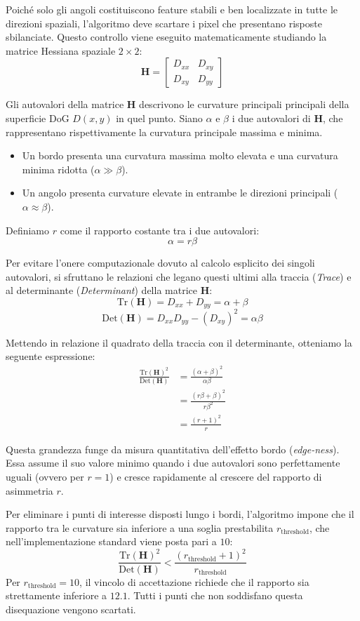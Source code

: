 ﻿\documentclass[11pt, a4paper]{article}
\begin{document}
Poiché solo gli angoli costituiscono feature stabili e ben localizzate in tutte le direzioni spaziali, l'algoritmo deve scartare i pixel che presentano risposte sbilanciate. Questo controllo viene eseguito matematicamente studiando la matrice Hessiana spaziale $2 \times 2$:
\[ \bm{H} = \begin{bmatrix} D_{xx} & D_{xy} \\ D_{xy} & D_{yy} \end{bmatrix} \]

Gli autovalori della matrice $\bm{H}$ descrivono le curvature principali principali della superficie DoG $D(x, y)$ in quel punto. Siano $\alpha$ e $\beta$ i due autovalori di $\bm{H}$, che rappresentano rispettivamente la curvatura principale massima e minima.
\begin{itemize}
    \item Un bordo presenta una curvatura massima molto elevata e una curvatura minima ridotta ($\alpha \gg \beta$).
    \item Un angolo presenta curvature elevate in entrambe le direzioni principali ($\alpha \approx \beta$).
\end{itemize}

Definiamo $r$ come il rapporto costante tra i due autovalori:
\[ \alpha = r\beta \]

Per evitare l'onere computazionale dovuto al calcolo esplicito dei singoli autovalori, si sfruttano le relazioni che legano questi ultimi alla traccia (\emph{Trace}) e al determinante (\emph{Determinant}) della matrice $\bm{H}$:
\[ \text{Tr}(\bm{H}) = D_{xx} + D_{yy} = \alpha + \beta \]
\[ \text{Det}(\bm{H}) = D_{xx}D_{yy} - (D_{xy})^2 = \alpha\beta \]

Mettendo in relazione il quadrato della traccia con il determinante, otteniamo la seguente espressione:
\begin{align*}
\frac{\text{Tr}(\bm{H})^2}{\text{Det}(\bm{H})} &= \frac{(\alpha + \beta)^2}{\alpha\beta} \\
&= \frac{(r\beta + \beta)^2}{r\beta^2} \\
&= \frac{(r+1)^2}{r}
\end{align*}

Questa grandezza funge da misura quantitativa dell'effetto bordo (\emph{edge-ness}). Essa assume il suo valore minimo quando i due autovalori sono perfettamente uguali (ovvero per $r=1$) e cresce rapidamente al crescere del rapporto di asimmetria $r$.

Per eliminare i punti di interesse disposti lungo i bordi, l'algoritmo impone che il rapporto tra le curvature sia inferiore a una soglia prestabilita $r_{\text{threshold}}$, che nell'implementazione standard viene posta pari a $10$:
\[ \boxed{\frac{\text{Tr}(\bm{H})^2}{\text{Det}(\bm{H})} < \frac{(r_{\text{threshold}} + 1)^2}{r_{\text{threshold}}}} \]
Per $r_{\text{threshold}} = 10$, il vincolo di accettazione richiede che il rapporto sia strettamente inferiore a $12.1$. Tutti i punti che non soddisfano questa disequazione vengono scartati.
\end{document}
